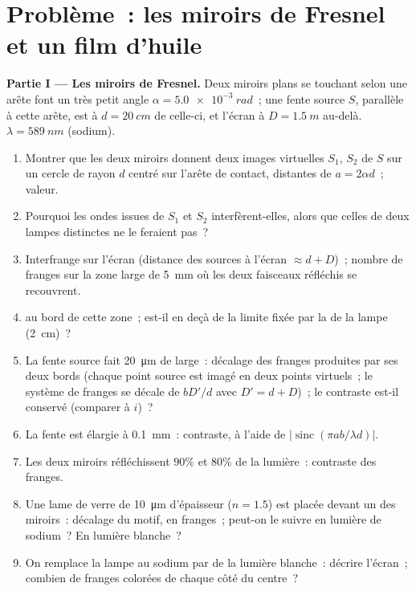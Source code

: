 \section{Problème~: les miroirs de Fresnel et un film d'huile}

\begin{problem}
\label{pb:b2:two-wave-interference:1}

\medskip
\noindent\textbf{Partie I --- Les miroirs de Fresnel.}
Deux miroirs plans se touchant selon une arête font un très petit angle $\alpha =
\qty{5.0e-3}{rad}$~; une fente source $S$, parallèle à cette arête, est à $d =
\qty{20}{cm}$ de celle-ci, et l'écran à $D = \qty{1.5}{m}$ au-delà. $\lambda =
\qty{589}{nm}$ (sodium).
\begin{enumerate}
  \item Montrer que les deux miroirs donnent deux images virtuelles $S_1$, $S_2$ de
        $S$ sur un cercle de rayon $d$ centré sur l'arête de contact,
        distantes de $a = 2\alpha d$~; valeur.
  \item Pourquoi les ondes issues de $S_1$ et $S_2$ interfèrent-elles, alors que celles de
        deux lampes distinctes ne le feraient pas~?
  \item Interfrange sur l'écran (distance des sources à
        l'écran $\approx d + D$)~; nombre de franges sur la
        zone large de \qty{5}{mm} où les deux faisceaux réfléchis se recouvrent.
  \item {} au bord de cette zone~; est-il en deçà
        de la limite fixée par la  de la lampe (\qty{2}{cm})~?
  \item La fente source fait \qty{20}{\micro m} de large~: décalage des franges
        produites par ses deux bords (chaque point source est imagé en deux
        points virtuels~; le système de franges se décale de $bD'/d$ avec $D' =
        d + D$)~; le contraste est-il conservé (comparer à $i$)~?
  \item La fente est élargie à \qty{0.1}{mm}~: contraste, à l'aide de
        $|\operatorname{sinc}(\pi ab/\lambda d)|$.
  \item Les deux miroirs réfléchissent $90\%$ et $80\%$ de la lumière~: contraste
        des franges.
  \item Une lame de verre de \qty{10}{\micro m} d'épaisseur ($n = 1.5$) est placée
        devant un des miroirs~: décalage du motif, en franges~; peut-on le
        suivre en lumière de sodium~? En lumière blanche~?
  \item On remplace la lampe au sodium par de la lumière blanche~: décrire l'écran~;
        combien de franges colorées de chaque côté du centre~?
\end{enumerate}


\end{problem}
